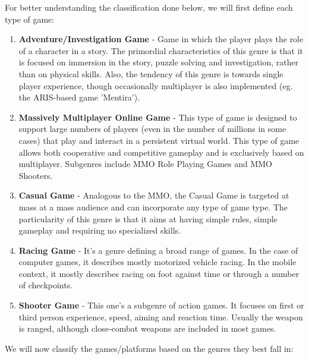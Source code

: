 For better understanding the classification done below, we will first define
each type of game:

\begin{enumerate}
  \item \textbf{Adventure/Investigation Game} - Game in which the player plays
  the role of a character in a story. The primordial characteristics of this
  genre is that it is focused on immersion in the story, puzzle solving and
  investigation, rather than on physical skills. Also, the tendency of this
  genre is towards single player experience, though occasionally multiplayer is
  also implemented (eg. the ARIS-based game 'Mentira').
  
  \item \textbf{Massively Multiplayer Online Game} - This type of game is
  designed to support large numbers of players (even in the number of millions
  in some cases) that play and interact in a persistent virtual world. This type
  of game allows both cooperative and competitive gameplay and is exclusively
  based on multiplayer. Subgenres include MMO Role Playing Games and
  MMO Shooters.
  
  \item \textbf{Casual Game} - Analogous to the MMO, the Casual Game is targeted
  at mass at a mass audience and can incorporate any type of game type. The
  particularity of this genre is that it aims at having simple rules, simple
  gameplay and requiring no specialized skills. 
  
  \item \textbf{Racing Game} - It's a genre defining a broad range of games. In
  the case of computer games, it describes mostly motorized vehicle racing. In
  the mobile context, it mostly describes racing on foot against time or through
  a number of checkpoints.
  
  \item \textbf{Shooter Game} - This one's a subgenre of action games. It
  focuses on first or third person experience, speed, aiming and reaction time.
  Usually the weapon is ranged, although close-combat weapons are included in
  most games.
  
\end{enumerate}

We will now classify the games/platforms based on the genres they best fall in:

